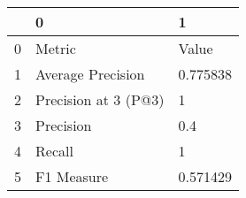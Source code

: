 \begin{tabular}{lll}
\toprule
{} &                     0 &         1 \\
\midrule
0 &                Metric &     Value \\
1 &     Average Precision &  0.775838 \\
2 &  Precision at 3 (P@3) &         1 \\
3 &             Precision &       0.4 \\
4 &                Recall &         1 \\
5 &            F1 Measure &  0.571429 \\
\bottomrule
\end{tabular}
